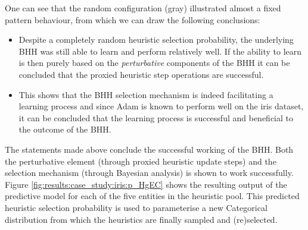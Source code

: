 One can see that the random configuration (gray) illustrated almost a fixed pattern behaviour, from which we can draw the following conclusions:

\begin{itemize}
      \item Despite a completely random heuristic selection probability, the underlying \Acs{BHH} was still able to learn and perform relatively well. If the ability to learn is then purely based on the \textit{perturbative} components of the \Acs{BHH} it can be concluded that the proxied heuristic step operations are successful.

      \item This shows that the \Acs{BHH} selection mechanism is indeed facilitating a learning process and since \Acs{Adam} is known to perform well on the iris dataset, it can be concluded that the learning process is successful and beneficial to the outcome of the \Acs{BHH}.
\end{itemize}

The statements made above conclude the successful working of the \Acs{BHH}. Both the perturbative element (through proxied heuristic update steps) and the selection mechanism (through Bayesian analysis) is shown to work successfully. Figure \ref{fig:results:case_study:iris:p_HgEC} shows the resulting output of the predictive model for each of the five entities in the heuristic pool. This predicted heuristic selection probability is used to parameterise a new Categorical distribution from which the heuristics are finally sampled and (re)selected.

